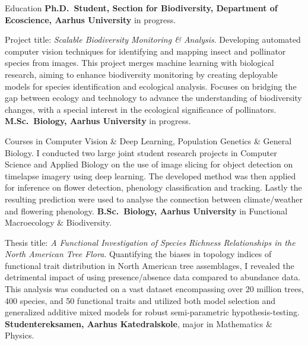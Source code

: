 \begin{rubric}{Education}
\entry*[2023 -- \ldots]
    \textbf{Ph.D.~Student, Section for Biodiversity, Department of Ecoscience, Aarhus University} in progress. \par
    \pind Project title: \textit{Scalable Biodiversity Monitoring \& Analysis}. Developing automated computer vision techniques for identifying and mapping insect and pollinator species from images. This project merges machine learning with biological research, aiming to enhance biodiversity monitoring by creating deployable models for species identification and ecological analysis. Focuses on bridging the gap between ecology and technology to advance the understanding of biodiversity changes, with a special interest in the ecological significance of pollinators.
%
\entry*[2022 -- \ldots]%
	\textbf{M.Sc.~Biology, Aarhus University} in progress.\par
    \pind Courses in Computer Vision \& Deep Learning, Population Genetics \& General Biology. I conducted two large joint student research projects in Computer Science and Applied Biology on the use of image slicing for object detection on timelapse imagery using deep learning. The developed method was then applied for inference on flower detection, phenology classification and tracking. Lastly the resulting prediction were used to analyse the connection between climate/weather and flowering phenology.
%
\entry*[2019 -- 2022]%
	\textbf{B.Sc.~Biology, Aarhus University} in Functional Macroecology \& Biodiversity.\par
	\pind Thesis title: \emph{A Functional Investigation of Species Richness Relationships in the North American Tree Flora}. Quantifying the biases in topology indices of functional trait distribution in North American tree assemblages, I revealed the detrimental impact of using presence/absence data compared to abundance data. This analysis was conducted on a vast dataset encompassing over 20 million trees, 400 species, and 50 functional traits and utilized both model selection and generalized additive mixed models for robust semi-parametric hypothesis-testing.
%
\entry*[2015 -- 2018]%
    \textbf{Studentereksamen, Aarhus Katedralskole}, major in Mathematics \& Physics.\par
%
\end{rubric}